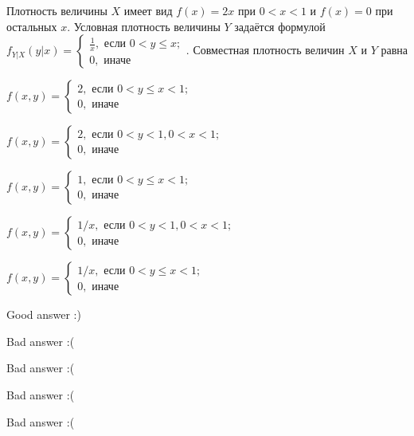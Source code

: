 
\begin{question}
Плотность величины \(X\) имеет вид \(f(x)=2x\) при \(0<x<1\) и
\(f(x)=0\) при остальных \(x\). Условная плотность величины \(Y\)
задаётся формулой
\(f_{Y|X}(y|x)=\begin{cases} \frac{1}{x}, \text{ если } 0<y\le x; \\ 0, \text{ иначе } \end{cases}.\)
Совместная плотность величин \(X\) и \(Y\) равна
\begin{answerlist}[2]
  \item \(f(x,y)=\begin{cases} 2, \text{ если } 0<y\le x<1; \\ 0, \text{ иначе} \end{cases}\)
  \item \(f(x,y)=\begin{cases} 2, \text{ если } 0<y<1, 0 < x<1; \\ 0, \text{ иначе} \end{cases}\)
  \item \(f(x,y)=\begin{cases} 1, \text{ если } 0<y\le x<1; \\ 0, \text{ иначе} \end{cases}\)
  \item \(f(x,y)=\begin{cases} 1/x, \text{ если } 0<y<1, 0 < x<1; \\ 0, \text{ иначе} \end{cases}\)
  \item \(f(x,y)=\begin{cases} 1/x, \text{ если } 0<y\le x<1; \\ 0, \text{ иначе} \end{cases}\)
\end{answerlist}
\end{question}

\begin{solution}
\begin{answerlist}
  \item Good answer :)
  \item Bad answer :(
  \item Bad answer :(
  \item Bad answer :(
  \item Bad answer :(
\end{answerlist}
\end{solution}
